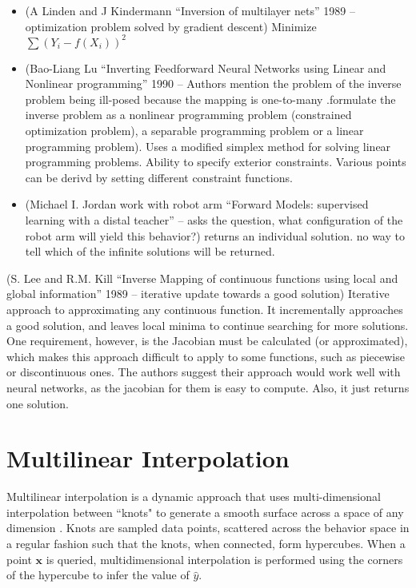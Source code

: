 \begin{itemize}
\item (A Linden and J Kindermann ``Inversion of multilayer nets'' 1989 -- optimization problem solved by gradient descent) Minimize $\sum (Y_i - f(X_i))^2$ \cite{linden1989inversion}
\item (Bao-Liang Lu ``Inverting Feedforward Neural Networks using Linear and Nonlinear programming'' 1990 --  Authors mention the problem of the inverse problem being ill-posed because the mapping is one-to-many .formulate the inverse problem as a nonlinear programming problem (constrained optimization problem), a separable programming problem or a linear programming problem). Uses a modified simplex method for solving linear programming problems.
Ability to specify exterior constraints.
Various points can be derivd by setting different constraint functions. \cite{lu1999inverting}
\item (Michael I. Jordan work with robot arm ``Forward Models: supervised learning with a distal teacher'' -- asks the question, what configuration of the robot arm will yield this behavior?)
returns an individual solution.
no way to tell which of the infinite solutions will be returned.
\end{itemize}

(S. Lee and R.M. Kill ``Inverse Mapping of continuous functions using local and global information'' 1989 -- iterative update towards a good solution)
Iterative approach to approximating any continuous function.
It incrementally approaches a good solution, and leaves local minima to continue searching for more solutions.
One requirement, however, is the Jacobian must be calculated (or approximated), which makes this approach difficult to apply to some functions, such as piecewise or discontinuous ones.
The authors suggest their approach would work well with neural networks, as the jacobian for them is easy to compute.
Also, it just returns one solution.



\section{Multilinear Interpolation}
\label{sec:multilinear}

Multilinear interpolation is a dynamic approach that uses multi-dimensional interpolation between ``knots" to generate a smooth surface across a space of any dimension \cite{davies1997multidimensional}.
Knots are sampled data points, scattered across the behavior space in a regular fashion such that the knots, when connected, form hypercubes.
When a point $\mathbf x$ is queried, multidimensional interpolation is performed using the corners of the hypercube to infer the value of $\hat y$.

